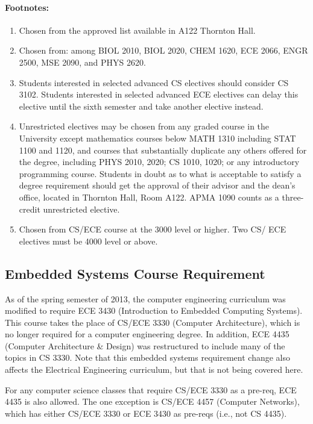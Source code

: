 \documentclass[10pt,letter]{book}
\newenvironment{numlist}{
\begin{enumerate}
\setlength{\itemsep}{0pt}
\setlength{\parskip}{0pt}}
{\end{enumerate}}
\begin{document}
\paragraph{Footnotes:}

\begin{numlist}
\item Chosen from the approved list available in A122 Thornton Hall.
\item Chosen from: among BIOL 2010, BIOL 2020, CHEM 1620, ECE 2066, ENGR
  2500, MSE 2090, and PHYS 2620.
\item Students interested in selected advanced CS electives should
  consider CS 3102.  Students interested in selected advanced ECE
  electives can delay this elective until the sixth semester and take
  another elective instead.
\item Unrestricted electives may be chosen from any graded course in
  the University except mathematics courses below MATH 1310 including
  STAT 1100 and 1120, and courses that substantially duplicate any
  others offered for the degree, including PHYS 2010, 2020; CS 1010,
  1020; or any introductory programming course. Students in doubt as
  to what is acceptable to satisfy a degree requirement should get the
  approval of their advisor and the dean's office, located in Thornton
  Hall, Room A122. APMA 1090 counts as a three-credit unrestricted
  elective.
\item Chosen from CS/ECE course at the 3000 level or higher. Two
  CS/ ECE electives must be 4000 level or above.
\end{numlist}

\subsection{Embedded Systems Course Requirement}
\label{embedded}

As of the spring semester of 2013, the computer engineering curriculum
was modified to require ECE 3430 (Introduction to Embedded Computing
Systems).  This course takes the place of CS/ECE 3330 (Computer
Architecture), which is no longer required for a computer engineering
degree.  In addition, ECE 4435 (Computer Architecture \& Design) was
restructured to include many of the topics in CS 3330.  Note that this
embedded systems requirement change also affects the Electrical
Engineering curriculum, but that is not being covered here.

For any computer science classes that require CS/ECE 3330 as a
pre-req, ECE 4435 is also allowed.  The one exception is CS/ECE 4457
(Computer Networks), which has either CS/ECE 3330 or ECE 3430 as
pre-reqs (i.e., not CS 4435).
\end{document}
